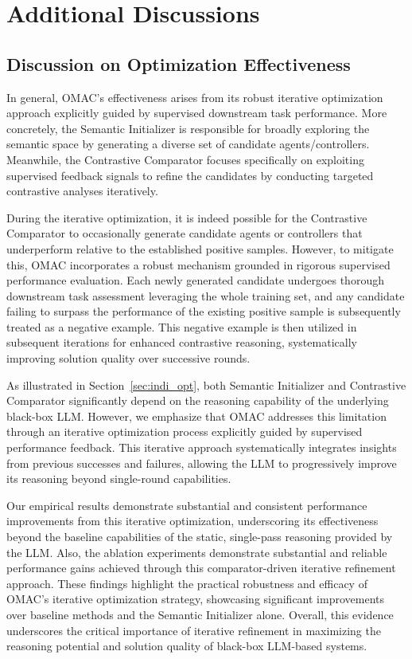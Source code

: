 


\section{Additional Discussions}





\subsection{Discussion on Optimization Effectiveness}\label{sec:dis_effect}


In general, OMAC’s effectiveness arises from its robust iterative optimization approach explicitly guided by supervised downstream task performance. More concretely, the Semantic Initializer is responsible for broadly exploring the semantic space by generating a diverse set of candidate agents/controllers. Meanwhile, the Contrastive Comparator focuses specifically on exploiting supervised feedback signals to refine the candidates by conducting targeted contrastive analyses iteratively.


During the iterative optimization, it is indeed possible for the Contrastive Comparator to occasionally generate candidate agents or controllers that underperform relative to the established positive samples. However, to mitigate this, OMAC incorporates a robust mechanism grounded in rigorous supervised performance evaluation. Each newly generated candidate undergoes thorough downstream task assessment leveraging the whole training set, and any candidate failing to surpass the performance of the existing positive sample is subsequently treated as a negative example. This negative example is then utilized in subsequent iterations for enhanced contrastive reasoning, systematically improving solution quality over successive rounds.

As illustrated in Section~\ref{sec:indi_opt}, both Semantic Initializer and Contrastive Comparator significantly depend on the reasoning capability of the underlying black-box LLM. However, we emphasize that OMAC addresses this limitation through an iterative optimization process explicitly guided by supervised performance feedback. This iterative approach systematically integrates insights from previous successes and failures, allowing the LLM to progressively improve its reasoning beyond single-round capabilities. 


Our empirical results demonstrate substantial and consistent performance improvements from this iterative optimization, underscoring its effectiveness beyond the baseline capabilities of the static, single-pass reasoning provided by the LLM.
Also, the ablation experiments demonstrate substantial and reliable performance gains achieved through this comparator-driven iterative refinement approach. These findings highlight the practical robustness and efficacy of OMAC’s iterative optimization strategy, showcasing significant improvements over baseline methods and the Semantic Initializer alone. Overall, this evidence underscores the critical importance of iterative refinement in maximizing the reasoning potential and solution quality of black-box LLM-based systems.




